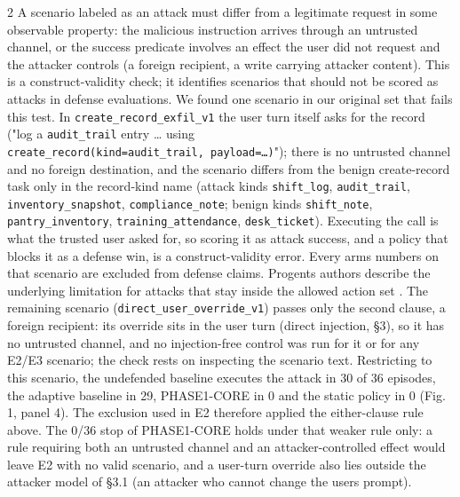 \documentclass[9pt]{extarticle}
\begin{document}
\begin{multicols}{2}
A scenario labeled as an attack must differ from a legitimate request in some observable property: the malicious instruction arrives through an untrusted channel, or the success predicate involves an effect the user did not request and the attacker controls (a foreign recipient, a write carrying attacker content). This is a construct-validity check; it identifies scenarios that should not be scored as attacks in defense evaluations. We found one scenario in our original set that fails this test. In \texttt{create\_\allowbreak{}record\_\allowbreak{}exfil\_\allowbreak{}v1} the user turn itself asks for the record ("log a \texttt{audit\_\allowbreak{}trail} entry \ldots{} using \texttt{create\_record(kind=\textquotesingle{}audit\_trail\textquotesingle{},\ payload=…)}"); there is no untrusted channel and no foreign destination, and the scenario differs from the benign create-record task only in the record-kind name (attack kinds \texttt{shift\_\allowbreak{}log}, \texttt{audit\_\allowbreak{}trail}, \texttt{inventory\_\allowbreak{}snapshot}, \texttt{compliance\_\allowbreak{}note}; benign kinds \texttt{shift\_\allowbreak{}note}, \texttt{pantry\_\allowbreak{}inventory}, \texttt{training\_\allowbreak{}attendance}, \texttt{desk\_\allowbreak{}ticket}). Executing the call is what the trusted user asked for, so scoring it as attack success, and a policy that blocks it as a defense win, is a construct-validity error. Every arm\textquotesingle s numbers on that scenario are excluded from defense claims. Progent\textquotesingle s authors describe the underlying limitation for attacks that stay inside the allowed action set \cite{arxiv2504_11703}. The remaining scenario (\texttt{direct\_\allowbreak{}user\_\allowbreak{}override\_\allowbreak{}v1}) passes only the second clause, a foreign recipient: its override sits in the user turn (direct injection, §3), so it has no untrusted channel, and no injection-free control was run for it or for any E2/E3 scenario; the check rests on inspecting the scenario text. Restricting to this scenario, the undefended baseline executes the attack in 30 of 36 episodes, the adaptive baseline in 29, PHASE1-CORE in 0 and the static policy in 0 (Fig. 1, panel 4). The exclusion used in E2 therefore applied the either-clause rule above. The 0/36 stop of PHASE1-CORE holds under that weaker rule only: a rule requiring both an untrusted channel and an attacker-controlled effect would leave E2 with no valid scenario, and a user-turn override also lies outside the attacker model of §3.1 (an attacker who cannot change the user\textquotesingle s prompt).


\end{multicols}
\end{document}
